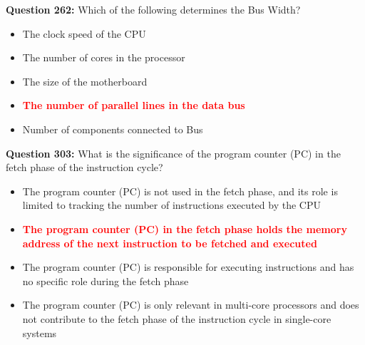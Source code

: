 \documentclass[12pt,a4paper]{article}
\begin{document}
\vspace{0.5cm}

\vspace{0.5cm}

\vspace{0.5cm}

\vspace{0.5cm}

\vspace{0.5cm}

\vspace{0.5cm}

\textbf{Question 262:} Which of the following determines the Bus Width?

\begin{itemize}
    \item[\textbf{A.}] The clock speed of the CPU
    \item[\textbf{B.}] The number of cores in the processor
    \item[\textbf{C.}] The size of the motherboard
    \item[\textbf{D.}] \textcolor{red}{\textbf{The number of parallel lines in the data bus}}
    \item[\textbf{E.}] Number of components connected to Bus
\end{itemize}

\vspace{0.5cm}

\vspace{0.5cm}

\textbf{Question 303:} What is the significance of the program counter (PC) in the fetch phase of the instruction cycle?

\begin{itemize}
    \item[\textbf{A.}] The program counter (PC) is not used in the fetch phase, and its role is limited to tracking the number of instructions executed by the CPU
    \item[\textbf{B.}] \textcolor{red}{\textbf{The program counter (PC) in the fetch phase holds the memory address of the next instruction to be fetched and executed}}
    \item[\textbf{C.}] The program counter (PC) is responsible for executing instructions and has no specific role during the fetch phase
    \item[\textbf{D.}] The program counter (PC) is only relevant in multi-core processors and does not contribute to the fetch phase of the instruction cycle in single-core systems
\end{itemize}
\end{document}
